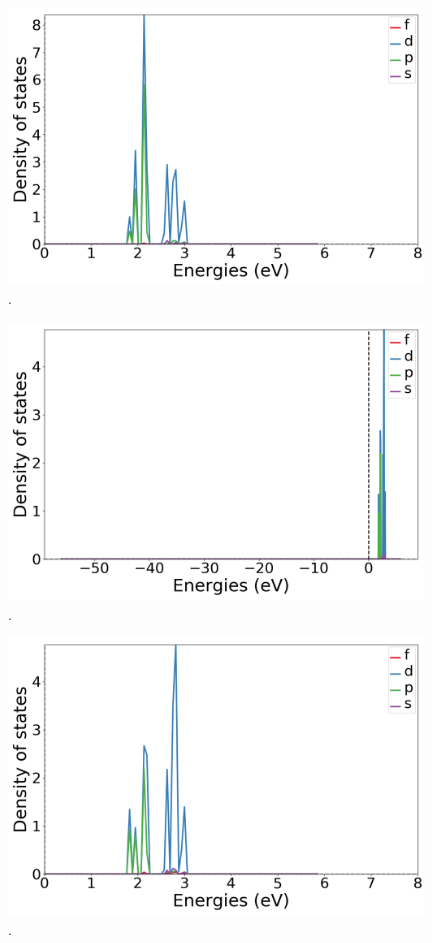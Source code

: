 \documentclass{article}
\begin{document}
  \begin{figure}[H]
      \centering
      \includegraphics[width = 11cm]{../fig/Yb_k4_LDOS25_2.png}
      \caption{. }
      \label{fig:Yb_k4_LDOS25_2.png}
  \end{figure}

  \begin{figure}[H]
      \centering
      \includegraphics[width = 11cm]{../fig/Yb_k4_LDOS26_1.png}
      \caption{. }
      \label{fig:Yb_k4_LDOS26_1.png}
  \end{figure}

  \begin{figure}[H]
      \centering
      \includegraphics[width = 11cm]{../fig/Yb_k4_LDOS26_2.png}
      \caption{. }
      \label{fig:Yb_k4_LDOS26_2.png}
  \end{figure}
\end{document}

